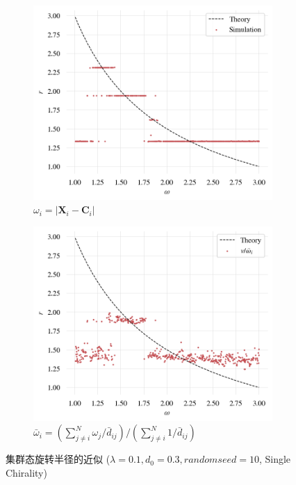 \documentclass{article}
\begin{document}
\begin{figure}[H]
	\centering
	\begin{subfigure}[b]{0.49\textwidth}
		\includegraphics[width=\textwidth]{./figs/SwarmStateRadius.png}
		\vspace{-1cm}
		\caption{$\omega_i = \left| \mathbf{X}_i - \mathbf{C}_i\right|$}
	\end{subfigure}
	\begin{subfigure}[b]{0.49\textwidth}
		\includegraphics[width=\textwidth]{./figs/wgtOmegaRadius.png}
		\vspace{-1cm}
		\caption{$\bar{\omega}_i = (\sum\nolimits_{j\ne i}^N{\omega _j/\bar{d}_{ij}}) / (\sum\nolimits_{j\ne i}^N{1/\bar{d}_{ij}})$}
	\end{subfigure}
	\vspace{-0.5cm}
	\caption{集群态旋转半径的近似 ($\lambda=0.1, d_0=0.3, random seed=10$, Single Chirality)}
	\label{fig:fig21.3}
\end{figure}
\end{document}
